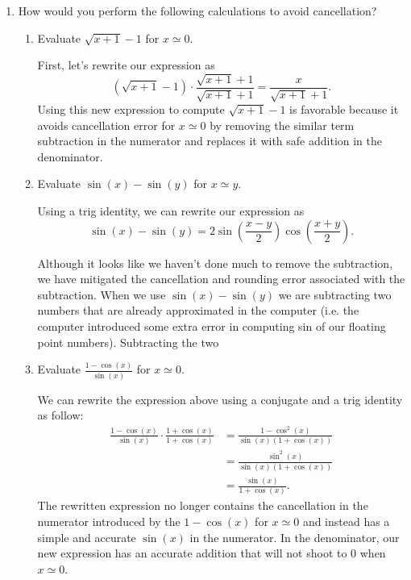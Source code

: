 \documentclass[a4paper,10pt]{article}
\begin{document}
\begin{enumerate}[label = \arabic*.)]
    \item How would you perform the following calculations to avoid cancellation?
        \begin{enumerate}[label = \roman*.]
            \item Evaluate $\sqrt{x + 1} - 1$ for $x \simeq 0$.
            
            First, let's rewrite our expression as
            \[
                (\sqrt{x + 1} - 1) \cdot \frac{\sqrt{x + 1} + 1}{\sqrt{x + 1} + 1} = \frac{x}{\sqrt{x + 1} + 1}.
            \]
            Using this new expression to compute $\sqrt{x + 1} - 1$ is favorable because it avoids cancellation error for $x \simeq 0$ by removing the similar term subtraction in the numerator and replaces it with safe addition in the denominator.
            
            \item Evaluate $\sin(x) - \sin(y)$ for $x \simeq y$.
            
            Using a trig identity, we can rewrite our expression as
            \[
                \sin(x) - \sin(y) = 2 \sin\left(\frac{x - y}{2}\right) \cos\left( \frac{x + y}{2} \right).
            \]
            
            Although it looks like we haven't done much to remove the subtraction, we have mitigated the cancellation and rounding error associated with the subtraction. When we use $ \sin(x) - \sin(y) $ we are subtracting two numbers that are already approximated in the computer (i.e. the computer introduced some extra error in computing sin of our floating point numbers). Subtracting the two 
            
            \item Evaluate $\frac{1 - \cos(x)}{\sin(x)}$ for $x \simeq 0$.
            
            We can rewrite the expression above using a conjugate and a trig identity as follow:
            \begin{align*}
                \frac{1 - \cos(x)}{\sin(x)} \cdot \frac{1 + \cos(x)}{1 + \cos(x)} &= \frac{1 - \cos^2(x)}{\sin(x) (1 + \cos(x))} \\
                &= \frac{\sin^2(x)}{\sin(x) (1 + \cos(x))} \\
                &= \frac{\sin(x)}{1 + \cos(x)}.
            \end{align*}
            The rewritten expression no longer contains the cancellation in the numerator introduced by the $1 - \cos(x)$ for $x \simeq 0$ and instead has a simple and accurate $\sin(x)$ in the numerator. In the denominator, our new expression has an accurate addition that will not shoot to 0 when $x \simeq 0$.
            

\end{enumerate}
\end{enumerate}
\end{document}
